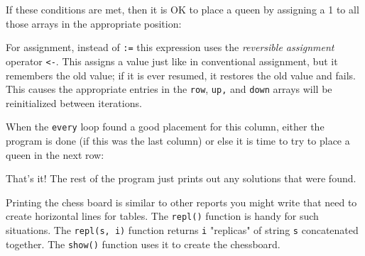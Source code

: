 If these conditions are met, then it is OK to place a queen by assigning
a 1 to all those arrays in the appropriate position:


For assignment, instead of \texttt{:=} this expression
uses the \textit{reversible assignment}
operator \texttt{{\textless}-}. This assigns a value just like in
conventional assignment, but it remembers the old value; if it is ever
resumed, it restores the old value and fails.
This causes the appropriate entries in the \texttt{row},
\texttt{up}\texttt{,} and \texttt{down} arrays will be reinitialized
between iterations.

When the \texttt{every} loop found a good placement for this column,
either the program is done (if this was the last column) or else it is
time to try to place a queen in the next row:


That's it! The rest of the program just prints out any
solutions that were found.

Printing the chess board is similar to other reports you might write
that need to create horizontal lines for tables. The \texttt{repl()}
function is handy for such situations. The \texttt{repl(s, i)} function
returns \texttt{i} "replicas" of string
\texttt{s} concatenated together. The \texttt{show()} function uses it
to create the chessboard.\textit{ }


